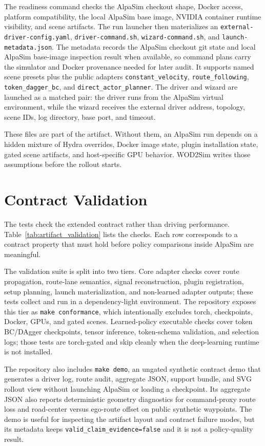 \documentclass{article}
\begin{document}
The readiness command checks the AlpaSim checkout shape, Docker access, platform
compatibility, the local AlpaSim base image, NVIDIA container runtime visibility, and
scene artifacts. The run launcher then materializes an
\texttt{external-driver-config.yaml}, \texttt{driver-command.sh},
\texttt{wizard-command.sh}, and \texttt{launch-metadata.json}. The metadata records the
AlpaSim checkout git state and local AlpaSim base-image inspection result when available,
so command plans carry the simulator and Docker provenance needed for later audit. It
supports named scene presets plus the public adapters \texttt{constant\_velocity},
\texttt{route\_following}, \texttt{token\_dagger\_bc}, and
\texttt{direct\_actor\_planner}. The driver and wizard are launched as a matched pair:
the driver runs from the AlpaSim virtual environment, while the wizard receives the
external driver address, topology, scene IDs, log directory, base port, and timeout.

These files are part of the artifact. Without them, an AlpaSim run depends on a hidden
mixture of Hydra overrides, Docker image state, plugin installation state, gated scene
artifacts, and host-specific GPU behavior. WOD2Sim writes those assumptions before
the rollout starts.

\section{Contract Validation}

The tests check the extended contract rather than driving performance.
Table~\ref{tab:artifact_validation} lists the checks. Each row corresponds to a contract
property that must hold before policy comparisons inside AlpaSim are meaningful.

The validation suite is split into two tiers. Core adapter checks
cover route propagation, route-lane semantics, signal reconstruction, plugin
registration, setup planning, launch materialization, and non-learned adapter outputs;
these tests collect and run in a dependency-light environment. The repository exposes
this tier as \texttt{make conformance}, which intentionally excludes torch, checkpoints,
Docker, GPUs, and gated scenes. Learned-policy executable checks cover token BC/DAgger
checkpoints, tensor inference, token-schema validation, and selection logs; those tests
are torch-gated and skip cleanly when the deep-learning runtime is not installed.

The repository also includes \texttt{make demo}, an ungated synthetic contract demo that
generates a driver log, route audit, aggregate JSON, support bundle, and SVG rollout view
without launching AlpaSim or loading a checkpoint. Its aggregate JSON also reports
deterministic geometry diagnostics for command-proxy route loss and road-center versus
ego-route offset on public synthetic waypoints. The demo is useful for inspecting the
artifact layout and contract failure modes, but its metadata keeps
\texttt{valid\_claim\_evidence=false} and it is not a policy-quality result.
\end{document}

